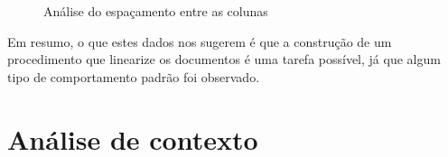 \documentclass[10pt, a4paper]{article}
\begin{document}
\begin{figure}[H]
    \centering
    \hfill
    
    \hfill
    

    \hfill
   

    \caption{Análise do espaçamento entre as colunas}
    \label{fig:spac_colunas}
\end{figure}


Em resumo, o que estes dados nos sugerem é que a construção de um procedimento que linearize os documentos é uma tarefa possível, já que algum tipo de comportamento padrão foi observado. 






\section {Análise de contexto}



\end{document}

